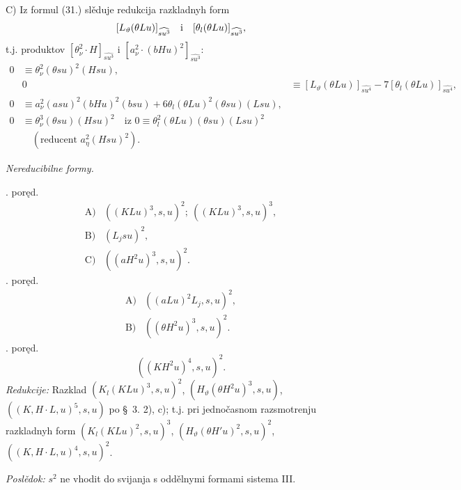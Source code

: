 \documentclass[11pt]{article}
\begin{document}
\mbox{C)} Iz formul (31.) slěduje redukcija razkladnyh form
\[
 [L_\vartheta(\theta Lu)]_{\widehat{su^3}}\quad\hbox{i}\quad [\theta_l(\theta Lu)]_{\widehat{su^3}},
\]
t.j. produktov $[\theta_\nu^2\cdot H]_{\widehat{su^3}}$ i $[a_\nu^2\cdot(bHu)^2]_{\widehat{su^3}}$:
\begin{equation}
\tag{32}
\begin{aligned}
0&\equiv\theta_\nu^2(\theta su)^2(Hsu),\\
&0&\equiv [L_\vartheta(\theta Lu)]_{\widehat{su^4}}-7[\theta_l(\theta Lu)]_{\widehat{su^4}},\\
0&\equiv a_\nu^2(asu)^2(bHu)^2(bsu)+6\theta_l(\theta Lu)^2(\theta su)(Lsu),\\
0&\equiv\theta_\nu^3(\theta su)(Hsu)^2
\quad\text{iz }0\equiv\theta_l^2(\theta Lu)(\theta su)(Lsu)^2\\
&\quad(\text{reducent }a_\eta^2(Hsu)^2).
\end{aligned}
\end{equation}

\noindent\textit{Nereducibilne formy.}

. poręd.
\[
\begin{array}{rl}
\mbox{A)}&((KLu)^3,s,u)^2;\ ((KLu)^3,s,u)^3,\\[0.25em]
\mbox{B)}&(L_jsu)^2,\\[0.25em]
\mbox{C)}&((aH^2u)^3,s,u)^2.
\end{array}
\]
. poręd.
\[
\begin{array}{rl}
\mbox{A)}&((aLu)^2L_j,s,u)^2,\\[0.25em]
\mbox{B)}&((\theta H^2u)^3,s,u)^2.
\end{array}
\]
. poręd.
\[
 ((KH^2u)^4,s,u)^2.
\]
\noindent\textit{Redukcije:} Razklad $(K_l(KLu)^3,s,u)^2$, $(H_\vartheta(\theta H^2u)^3,s,u)$, $((K,H\cdot L,u)^5,s,u)$ po \S\ 3. \mbox{2)}, \mbox{c)}; t.j. pri jednočasnom razsmotrenju razkladnyh form $(K_l(KLu)^2,s,u)^3$, $(H_\vartheta(\theta H'u)^2,s,u)^2$, $((K,H\cdot L,u)^4,s,u)^2$.

\noindent\textit{Poslědok:} $s^2$ ne vhodit do svijanja s oddělnymi formami sistema III.
\end{document}
